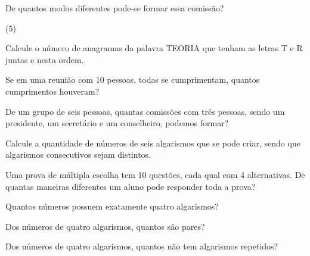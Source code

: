 \documentclass[10pt,a4paper]{article}
\begin{document}
\begin{multicols}{2}
\begin{question}[type=exam]
        De quantos modos diferentes pode-se formar essa comissão?

        \begin{tasks}(5)
        \end{tasks}
    \end{question}

    \begin{question}[type=exam]
        Calcule o número de anagramas da palavra TEORIA que tenham as letras
        T e R juntas e nesta ordem.
    \end{question}

    \begin{question}[type=exam]
        Se em uma reunião com 10 pessoas, todas se cumprimentam, quantos cumprimentos
        houveram?
    \end{question}

    \begin{question}[type=exam]
        De um grupo de seis pessoas, quantas comissões com três pessoas, sendo
        um presidente, um secretário e um conselheiro, podemos formar?
    \end{question}

    \begin{question}[type=exam]
        Calcule a quantidade de números de seis algarismos que se pode criar, sendo
        que algarismos consecutivos sejam distintos.
    \end{question}

    \begin{question}[type=exam]
        Uma prova de múltipla escolha tem 10 questões, cada qual com 4 alternativas.
        De quantas maneiras diferentes um aluno pode responder toda a prova?
    \end{question}

    \begin{question}[type=exam]
        Quantos números possuem exatamente quatro algarismos?
    \end{question}

    \begin{question}[type=exam]
        Dos números de quatro algarismos, quantos são pares?
    \end{question}

    \begin{question}[type=exam]
        Dos números de quatro algarismos, quantos não tem algarismos repetidos?
    \end{question}


\end{multicols}
\end{document}
